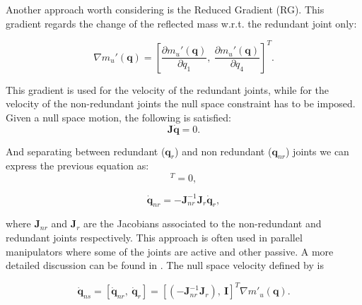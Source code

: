 Another approach worth considering is the Reduced Gradient (RG). 
This gradient regards the change of the reflected mass w.r.t. the redundant joint only:

\begin{equation}
\nabla m_u'(\mathbf{q}) = \left[
\frac{\partial {m_u'(\mathbf{q})}}{\partial {q_1}}, \   \frac{\partial {m_u'(\mathbf{q})}}{\partial {q_4}} \right]^{T}. \label{eq:grad_refl_mass_RG}
\end{equation}

This gradient is used for the velocity of the redundant joints, while for the velocity of the non-redundant joints the null space constraint has to be imposed. Given a null space motion, the following is satisfied:
\begin{equation}
\mathbf{J} \dot{\mathbf{q}} = 0 .
\label{eq:ns_motion}
\end{equation}

And separating between redundant (${\mathbf{q}}_{r}$) and non redundant (${\mathbf{q}}_{nr}$) joints we can express the previous equation as:
\begin{equation}
[\mathbf{J}_r, \ \mathbf{J}_{nr}] [\mathbf{\dot{q}}_r, \  \dot{\mathbf{q}}_{nr}]^T = 0    ,
\label{eq:}
\end{equation}

\begin{equation}
\dot{\mathbf{q}}_{nr} =  - \mathbf{J}_{nr}^{-1} \mathbf{J}_r \mathbf{\dot{q}}_r    ,
\label{eq:ns_constraint}
\end{equation}

where $\mathbf{J}_{nr}$ and $\mathbf{J}_{r}$ are the Jacobians associated to the non-redundant and redundant joints respectively. This approach is often used in parallel manipulators where some of the joints are active and other passive. A more detailed discussion can be found in \cite{Murray:1994:MIR:561828}. The null space velocity defined by \cite{reduced_gradient} is

\begin{equation}
\mathbf{\dot{q}}_{ns} = \left[\mathbf{\dot{q}}_{nr}, \  \mathbf{\dot{q}}_{r} \right ] 
= \left[(-\mathbf{J}_{nr}^{-1} \mathbf{J}_r), \    \mathbf{I} \right ]^{T}  \nabla m'_u(\mathbf{q}).
\label{eq:ns_velocity_RG}
\end{equation}


